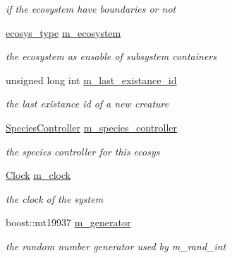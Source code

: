 \begin{DoxyCompactItemize}
\begin{DoxyCompactList}\small\item\em if the ecosystem have boundaries or not \end{DoxyCompactList}\item 
\hyperlink{classEcosystemContainer_a52c612c138ad2af06dcf353e6c541345}{ecosys\_\-type} \hyperlink{classEcosystemContainer_a19f047377f131b497c7258b58adb1a45}{m\_\-ecosystem}
\begin{DoxyCompactList}\small\item\em the ecosystem as ensable of subsystem containers \end{DoxyCompactList}\item 
unsigned long int \hyperlink{classEcosystemContainer_adefb24e46962eab1528a2fc322ae6e53}{m\_\-last\_\-existance\_\-id}
\begin{DoxyCompactList}\small\item\em the last existance id of a new creature \end{DoxyCompactList}\item 
\hyperlink{classSpeciesController}{SpeciesController} \hyperlink{classEcosystemContainer_a41211c58341df2a0ef7ee44b69151de0}{m\_\-species\_\-controller}
\begin{DoxyCompactList}\small\item\em the species controller for this ecosys \end{DoxyCompactList}\item 
\hypertarget{classEcosystemContainer_aaf112f8024a548d0266bd4b87653c2f8}{
\hyperlink{classClock}{Clock} \hyperlink{classEcosystemContainer_aaf112f8024a548d0266bd4b87653c2f8}{m\_\-clock}}
\label{classEcosystemContainer_aaf112f8024a548d0266bd4b87653c2f8}

\begin{DoxyCompactList}\small\item\em the clock of the system \end{DoxyCompactList}\item 
\hypertarget{classEcosystemContainer_aa6403dd5bcafef13d4f696f3f8c4f52a}{
boost::mt19937 \hyperlink{classEcosystemContainer_aa6403dd5bcafef13d4f696f3f8c4f52a}{m\_\-generator}}
\label{classEcosystemContainer_aa6403dd5bcafef13d4f696f3f8c4f52a}

\begin{DoxyCompactList}\small\item\em the random number generator used by m\_\-rand\_\-int \end{DoxyCompactList}\end{DoxyCompactItemize}
